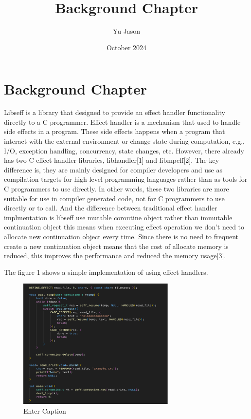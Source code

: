 \documentclass{article}
\title{Background Chapter}
\author{Yu Jason}
\date{October 2024}
\begin{document}
\maketitle

\section{Background Chapter}
Libseff is a library that designed to provide an effect handler functionality directly to a C programmer. Effect handler is a mechanism that used to handle side effects in a program. These side effects happens when a program that interact with the external environment or change state during computation, e.g., I/O, exception handling, concurrency, state changes, etc. However, there already has two C effect handler libraries, libhandler[1] and libmpeff[2]. The key difference is, they are mainly designed for compiler developers and use as compilation targets for high-level programming languages rather than as tools for C programmers to use directly. In other words, these two libraries are more suitable for use in compiler generated code, not for C programmers to use directly or to call. And the difference between traditional effect handler implmentation is libseff use mutable coroutine object rather than immutable continuation object this means when executing effect operation we don't need to allocate new continuation object every time. Since there is no need to frequent create a new continuation object means that the cost of allocate memory is reduced, this improves the performance and reduced the memory usage[3].
\medskip

The figure 1 shows a simple implementation of using effect handlers.

\begin{figure}[H]
    \centering
    \includegraphics[width=0.7\textwidth]{image.png}
    \caption{Enter Caption}
    \label{fig:enter-label}
\end{figure}
\end{document}
